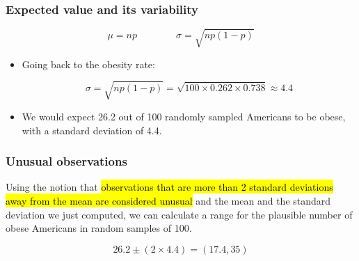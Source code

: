 \documentclass[slidestop,compress,mathserif]{beamer}
\begin{document}

\begin{frame}
\frametitle{Expected value and its variability}

{\[ \mu = np \qquad \qquad \sigma = \sqrt{np(1-p)} \] }

\pause

\begin{itemize}

\item Going back to the obesity rate:

\[ \sigma = \sqrt{np(1-p)} = \sqrt{100 \times 0.262 \times 0.738} \approx  4.4\]

\pause

\item We would expect 26.2 out of 100 randomly sampled Americans to be obese, with a standard deviation of 4.4.

\end{itemize}


\end{frame}


\begin{frame}
\frametitle{Unusual observations}

Using the notion that \hl{observations that are more than 2 standard deviations away from the mean are considered unusual} and the mean and the standard deviation we just computed, we can calculate a range for the plausible number of obese Americans in random samples of 100.

\[ 26.2 \pm (2 \times 4.4) = (17.4, 35) \]

\end{frame}

\end{document}
